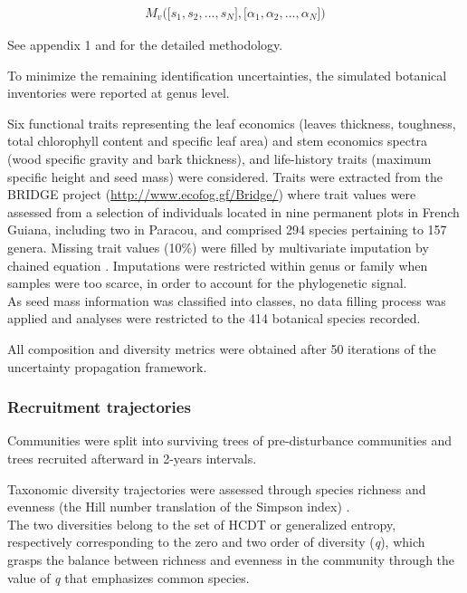 \documentclass[
  11pt,
  french,
  A4paper,
  extrafontsizes,onecolumn,openright
  ]{memoir}
\begin{document}
\begin{align}
M_v\Big(\big[s_1, s_2,..., s_N\big],\big[\alpha_1, \alpha_2,..., \alpha_N\big]\Big) \nonumber
\end{align}

See appendix 1 and \textcite{Aubry-Kientz2013} for the detailed
methodology.

To minimize the remaining identification uncertainties, the simulated
botanical inventories were reported at genus level.

Six functional traits representing the leaf economics (leaves thickness,
toughness, total chlorophyll content and specific leaf area) and stem
economics spectra (wood specific gravity and bark thickness), and
life-history traits (maximum specific height and seed mass) were
considered. Traits were extracted from the BRIDGE project
(\url{http://www.ecofog.gf/Bridge/}) where trait values were assessed
from a selection of individuals located in nine permanent plots in
French Guiana, including two in Paracou, and comprised 294 species
pertaining to 157 genera. Missing trait values (10\%) were filled by
multivariate imputation by chained equation \autocite{Mice2011}.
Imputations were restricted within genus or family when samples were too
scarce, in order to account for the phylogenetic signal.\\
As seed mass information was classified into classes, no data filling
process was applied and analyses were restricted to the 414 botanical
species recorded.

All composition and diversity metrics were obtained after 50 iterations
of the uncertainty propagation framework.

\subsubsection{Recruitment trajectories}\label{recruitment-trajectories}

Communities were split into surviving trees of pre-disturbance
communities and trees recruited afterward in 2-years intervals.

Taxonomic diversity trajectories were assessed through species richness
and evenness (the Hill number translation of the Simpson index)
\autocites{Chao2015}{Marcon2015b}.\\
The two diversities belong to the set of HCDT or generalized entropy,
respectively corresponding to the zero and two order of diversity
(\emph{q}), which grasps the balance between richness and evenness in
the community through the value of \emph{q} that emphasizes common
species.
\end{document}
